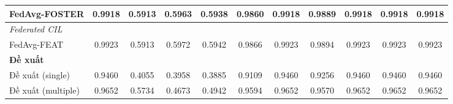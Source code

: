 \begin{table}[H]
{\begin{tabular}{lcccccccccc}
        FedAvg-FOSTER & 0.9918 & \cellcolor{green!90!black}0.5913 & 0.5963 & 0.5938 & 0.9860 & 0.9918 & 0.9889 & 0.9918 & 0.9918 & 0.9918 \\
        \hline
        \multicolumn{11}{l}{\textit{Federated CIL}} \\
        FedAvg-FEAT & \cellcolor{green!60!black}0.9923 & \cellcolor{green!30}0.5913 & \cellcolor{green!60!black}0.5972 & \cellcolor{green!60!black}0.5942 & \cellcolor{green!60!black}0.9866 & \cellcolor{green!60!black}0.9923 & \cellcolor{green!60!black}0.9894 & \cellcolor{green!60!black}0.9923 & \cellcolor{green!60!black}0.9923 & \cellcolor{green!60!black}0.9923 \\
        \hline
        \multicolumn{11}{l}{\textbf{Đề xuất}} \\
        Đề xuất (single) & 0.9460 & 0.4055 & 0.3958 & 0.3885 & 0.9109 & 0.9460 & 0.9256 & 0.9460 & 0.9460 & 0.9460 \\
        Đề xuất (multiple) & 0.9652 & 0.5734 & 0.4673 & 0.4942 & 0.9594 & 0.9652 & 0.9570 & 0.9652 & 0.9652 & 0.9652 \\
        \hline
    \end{tabular}}
\end{table}

